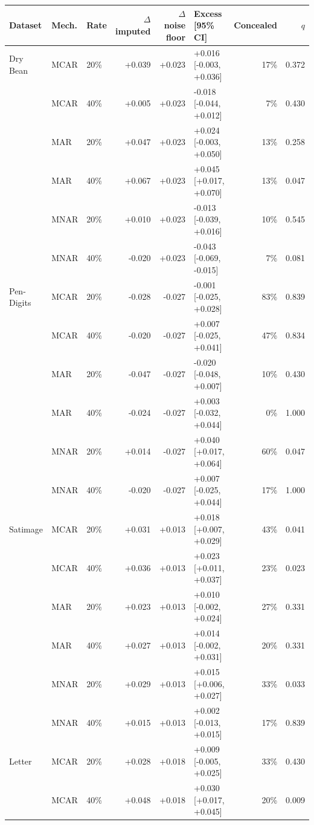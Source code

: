 \begin{tabular}{lllrrlrr}
\toprule
Dataset & Mech. & Rate & $\Delta$ imputed & $\Delta$ noise floor & Excess [95\% CI] & Concealed & $q$ \\
\midrule
Dry Bean & MCAR & 20\% & +0.039 & +0.023 & +0.016 [-0.003, +0.036] & 17\% & 0.372 \\
 & MCAR & 40\% & +0.005 & +0.023 & -0.018 [-0.044, +0.012] & 7\% & 0.430 \\
 & MAR & 20\% & +0.047 & +0.023 & +0.024 [-0.003, +0.050] & 13\% & 0.258 \\
 & MAR & 40\% & +0.067 & +0.023 & +0.045 [+0.017, +0.070] & 13\% & 0.047 \\
 & MNAR & 20\% & +0.010 & +0.023 & -0.013 [-0.039, +0.016] & 10\% & 0.545 \\
 & MNAR & 40\% & -0.020 & +0.023 & -0.043 [-0.069, -0.015] & 7\% & 0.081 \\
\midrule
Pen-Digits & MCAR & 20\% & -0.028 & -0.027 & -0.001 [-0.025, +0.028] & 83\% & 0.839 \\
 & MCAR & 40\% & -0.020 & -0.027 & +0.007 [-0.025, +0.041] & 47\% & 0.834 \\
 & MAR & 20\% & -0.047 & -0.027 & -0.020 [-0.048, +0.007] & 10\% & 0.430 \\
 & MAR & 40\% & -0.024 & -0.027 & +0.003 [-0.032, +0.044] & 0\% & 1.000 \\
 & MNAR & 20\% & +0.014 & -0.027 & +0.040 [+0.017, +0.064] & 60\% & 0.047 \\
 & MNAR & 40\% & -0.020 & -0.027 & +0.007 [-0.025, +0.044] & 17\% & 1.000 \\
\midrule
Satimage & MCAR & 20\% & +0.031 & +0.013 & +0.018 [+0.007, +0.029] & 43\% & 0.041 \\
 & MCAR & 40\% & +0.036 & +0.013 & +0.023 [+0.011, +0.037] & 23\% & 0.023 \\
 & MAR & 20\% & +0.023 & +0.013 & +0.010 [-0.002, +0.024] & 27\% & 0.331 \\
 & MAR & 40\% & +0.027 & +0.013 & +0.014 [-0.002, +0.031] & 20\% & 0.331 \\
 & MNAR & 20\% & +0.029 & +0.013 & +0.015 [+0.006, +0.027] & 33\% & 0.033 \\
 & MNAR & 40\% & +0.015 & +0.013 & +0.002 [-0.013, +0.015] & 17\% & 0.839 \\
\midrule
Letter & MCAR & 20\% & +0.028 & +0.018 & +0.009 [-0.005, +0.025] & 33\% & 0.430 \\
 & MCAR & 40\% & +0.048 & +0.018 & +0.030 [+0.017, +0.045] & 20\% & 0.009 \\

\end{tabular}
